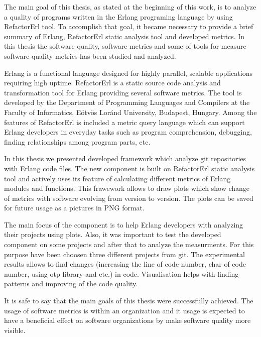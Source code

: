 The main goal of this thesis, as stated at the beginning of this work, is to analyze a quality of programs written in the Erlang programing language by using RefactorErl tool. To accomplish that goal, it became necessary to provide a brief summary of Erlang, RefactorErl static analysis tool and developed metrics. In this thesis the software quality, software metrics and some of tools for measure software quality metrics has been studied and analyzed.

Erlang is a functional language designed for highly parallel, scalable applications requiring high uptime. RefactorErl is a static source code analysis and transformation tool for Erlang providing several software metrics. The tool is developed by the Department of Programming Languages and Compilers at the Faculty of Informatics, Eötvös Loránd University, Budapest, Hungary. Among the features of RefactorErl is included a metric query language which can support Erlang developers in everyday tasks such as program comprehension, debugging, finding relationships among program parts, etc.

In this thesis we presented developed framework which analyze git repositories with Erlang code files. The new component is built on RefactorErl static analysis tool and actively uses its feature of calculating different metrics of Erlang modules and functions. This frawework allows to draw plots which show change of metrics with software evolving from version to version. The plots can be saved for future usage as a pictures in PNG format. 

The main focus of the component is to help Erlang developers with analyzing their projects using plots. Also, it was important to test the developed component on some projects and after that to analyze the measurments. For this purpose have been choosen three different projects from git. The experimental results allows to find changes (increasing the line of code number, char of code number, using otp library and etc.) in code. Visualisation helps with finding patterns and improving of the code quality.

It is safe to say that the main goals of this thesis were successfully achieved. The usage of software metrics is within an organization and it usage is expected to have a beneficial effect on software organizations by make software quality more visible.